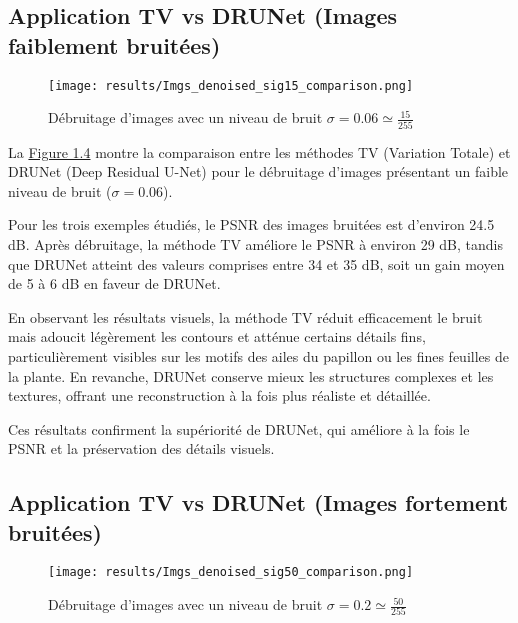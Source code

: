 \documentclass[a4paper, 12pt]{report} %
\begin{document}
\subsection{Application TV vs DRUNet (Images faiblement bruitées)}
\begin{figure}[H]
\centering
\begin{adjustbox}{width=0.985\linewidth, totalheight=0.47 \textheight, angle=0, scale= 0.9, minipage= 4.2\linewidth, margin= 0}
\texttt{[image: results/Imgs\_denoised\_sig15\_comparison.png]}
\end{adjustbox}
\caption{Débruitage d'images avec un niveau de bruit $\sigma = 0.06 \simeq \frac{15}{255}$} 
    
    \label{fig:4}
\end{figure}   

La \hyperref[fig:4]{Figure 1.4} montre la comparaison entre les méthodes TV (Variation Totale) et DRUNet (Deep Residual U-Net) pour le débruitage d’images présentant un faible niveau de bruit (\(\sigma=0.06\)).

Pour les trois exemples étudiés, le PSNR des images bruitées est d’environ 24.5 dB. Après débruitage, la méthode TV améliore le PSNR à environ 29 dB, tandis que DRUNet atteint des valeurs comprises entre 34 et 35 dB, soit un gain moyen de 5 à 6 dB en faveur de DRUNet.

En observant les résultats visuels, la méthode TV réduit efficacement le bruit mais adoucit légèrement les contours et atténue certains détails fins, particulièrement visibles sur les motifs des ailes du papillon ou les fines feuilles de la plante. En revanche, DRUNet conserve mieux les structures complexes et les textures, offrant une reconstruction à la fois plus réaliste et détaillée. 

Ces résultats confirment la supériorité de DRUNet, qui améliore à la fois le PSNR et la préservation des détails visuels.


\subsection{Application TV vs DRUNet (Images fortement bruitées)}
\begin{figure}[H]
\centering
\begin{adjustbox}{width=0.985\linewidth, totalheight=0.47 \textheight, angle=0, scale= 0.9, minipage= 4.2\linewidth, margin= 0}
\texttt{[image: results/Imgs\_denoised\_sig50\_comparison.png]}
\end{adjustbox}
    \caption{Débruitage d'images avec un niveau de bruit
    $\sigma = 0.2 \simeq \frac{50}{255}$}
    \label{fig:5}
\end{figure}
\end{document}
